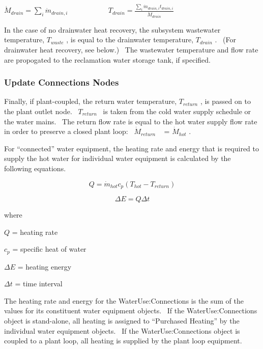 \({\dot M_{drain}} = \mathop \sum \limits_i {\dot m_{drain,i}}\) ~~~~~~~~~~ \({T_{drain}} = \frac{{\mathop \sum \limits_i {{\dot m}_{drain,i}}{t_{drain,i}}}}{{{{\dot M}_{drain}}}}\)

In the case of no drainwater heat recovery, the subsystem wastewater temperature, \({T_{waste}}\) , is equal to the drainwater temperature, \({T_{drain}}\) .~ (For drainwater heat recovery, see below.)~ The wastewater temperature and flow rate are propogated to the reclamation water storage tank, if specified.

\subsubsection{Update Connections Nodes}\label{update-connections-nodes}

Finally, if plant-coupled, the return water temperature, \({T_{return}}\) , is passed on to the plant outlet node.~ \({T_{return}}\) ~is taken from the cold water supply schedule or the water mains.~ The return flow rate is equal to the hot water supply flow rate in order to preserve a closed plant loop:~ \({\dot M_{return}}\) ~ = \({\dot M_{hot}}\) .

For ``connected'' water equipment, the heating rate and energy that is required to supply the hot water for individual water equipment is calculated by the following equations.

\begin{equation}
Q = {\dot m_{hot}}{c_p}\left( {{T_{hot}} - {T_{return}}} \right)
\end{equation}

\begin{equation}
\Delta E = Q\Delta t
\end{equation}

where

\(Q\) = heating rate

\({c_p}\) = specific heat of water

\(\Delta E\) = heating energy

\(\Delta t\) = time interval

The heating rate and energy for the WaterUse:Connections is the sum of the values for its constituent water equipment objects.~ If the WaterUse:Connections object is stand-alone, all heating is assigned to ``Purchased Heating'' by the individual water equipment objects.~ If the WaterUse:Connections object is coupled to a plant loop, all heating is supplied by the plant loop equipment.

